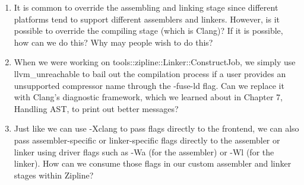 \begin{enumerate}
\item It is common to override the assembling and linking stage since different platforms tend to support different assemblers and linkers. However, is it possible to override the compiling stage (which is Clang)? If it is possible, how can we do this? Why may people wish to do this?

\item When we were working on tools::zipline::Linker::ConstructJob, we simply use llvm\_unreachable to bail out the compilation process if a user provides an unsupported compressor name through the -fuse-ld flag. Can we replace it with Clang's diagnostic framework, which we learned about in Chapter 7, Handling AST, to print out better messages?

\item Just like we can use -Xclang to pass flags directly to the frontend, we can also pass assembler-specific or linker-specific flags directly to the assembler or linker using driver flags such as -Wa (for the assembler) or -Wl (for the linker). How can we consume those flags in our custom assembler and linker stages within Zipline?

\end{enumerate}